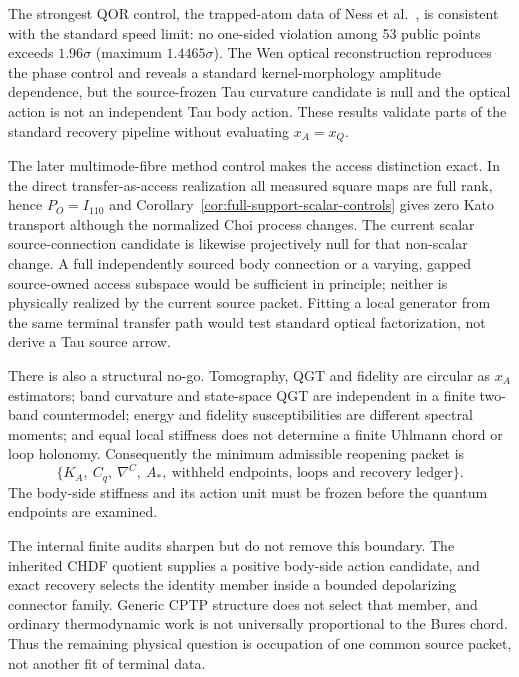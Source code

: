 \documentclass[11pt]{article}
\begin{document}
The strongest QOR control, the trapped-atom data of Ness et al.\
\citep{Ness2021QSL}, is consistent with the standard speed limit: no one-sided
violation among 53 public points exceeds $1.96\sigma$ (maximum
$1.4465\sigma$).  The Wen optical reconstruction reproduces the phase control
and reveals a standard kernel-morphology amplitude dependence, but the
source-frozen Tau curvature candidate is null and the optical action is not an
independent Tau body action.  These results validate parts of the standard
recovery pipeline without evaluating $x_A=x_Q$.

The later multimode-fibre method control makes the access distinction exact.
In the direct transfer-as-access realization all measured square maps are full
rank, hence \(P_O=I_{110}\) and Corollary~\ref{cor:full-support-scalar-controls}
gives zero Kato transport although the normalized Choi process changes.  The
current scalar source-connection candidate is likewise projectively null for
that non-scalar change.  A full independently sourced body connection or a
varying, gapped source-owned access subspace would be sufficient in principle;
neither is physically realized by the current source packet.  Fitting a local
generator from the same terminal transfer path would test standard optical
factorization, not derive a Tau source arrow.

There is also a structural no-go.  Tomography, QGT and fidelity are circular as
$x_A$ estimators; band curvature and state-space QGT are independent in a
finite two-band countermodel; energy and fidelity susceptibilities are
different spectral moments; and equal local stiffness does not determine a
finite Uhlmann chord or loop holonomy.  Consequently the minimum admissible
reopening packet is
\begin{equation}
 \boxed{\{K_A,\ C_q,\ \nabla^C,\ A_*,\
          \text{withheld endpoints, loops and recovery ledger}\}}.
 \label{eq:minimal-blind-packet}
\end{equation}
The body-side stiffness and its action unit must be frozen before the quantum
endpoints are examined.

The internal finite audits sharpen but do not remove this boundary.  The
inherited CHDF quotient supplies a positive body-side action candidate, and
exact recovery selects the identity member inside a bounded depolarizing
connector family.  Generic CPTP structure does not select that member, and
ordinary thermodynamic work is not universally proportional to the Bures
chord.  Thus the remaining physical question is occupation of one common
source packet, not another fit of terminal data.
\end{document}
